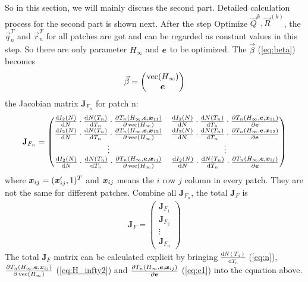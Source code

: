 So in this section, we will mainly discuss the second part. Detailed calculation process for the second part is shown next. After the step Optimize $\vec{Q}^k, \vec{R}^{(k)}$, the $\vec{q}_n^T$ and $\vec{r}_n^T$ for all patches are got and can be regarded as constant values in this step. So there are only parameter $H_\infty$ and $\boldsymbol{e}$ to be optimized. The $\vec{\beta}$ (\cref{eq:beta}) becomes 
\begin{align}
	\vec{\beta} =  \begin{pmatrix}\operatorname {vec}(H_\infty)\\\boldsymbol{e}\end{pmatrix}
\end{align}
the Jacobian matrix $\mathbf{J}_{F_n}$ for patch n: 
\begin{align}
	\mathbf{J}_{F_n} = \begin{pmatrix}
	\frac{\mathrm{d} I_2(N)}{\mathrm{d}N} \cdot \frac{\mathrm{d} N(T_n)}{\mathrm{d} T_n} \cdot \frac{\partial T_n(H_\infty, \boldsymbol{e}, \boldsymbol{x}_{11})}{\partial \operatorname {vec}(H_\infty)} & \frac{\mathrm{d} I_2(N)}{\mathrm{d}N} \cdot \frac{\mathrm{d} N(T_n)}{\mathrm{d} T_n} \cdot \frac{\partial T_n(H_\infty, \boldsymbol{e}, \boldsymbol{x}_{11})}{\partial \boldsymbol{e}} \\
	\frac{\mathrm{d} I_2(N)}{\mathrm{d}N} \cdot \frac{\mathrm{d} N(T_n)}{\mathrm{d} T_n} \cdot \frac{\partial T_n(H_\infty, \boldsymbol{e}, \boldsymbol{x}_{12})}{\partial \operatorname {vec}(H_\infty)} & \frac{\mathrm{d} I_2(N)}{\mathrm{d}N} \cdot \frac{\mathrm{d} N(T_n)}{\mathrm{d} T_n} \cdot \frac{\partial T_n(H_\infty, \boldsymbol{e}, \boldsymbol{x}_{12})}{\partial \boldsymbol{e}} \\
	\vdots & \vdots \\
	\frac{\mathrm{d} I_2(N)}{\mathrm{d}N} \cdot \frac{\mathrm{d} N(T_n)}{\mathrm{d} T_n} \cdot \frac{\partial T_n(H_\infty, \boldsymbol{e}, \boldsymbol{x}_{ij})}{\partial \operatorname {vec}(H_\infty)} & \frac{\mathrm{d} I_2(N)}{\mathrm{d}N} \cdot \frac{\mathrm{d} N(T_n)}{\mathrm{d} T_n} \cdot \frac{\partial T_n(H_\infty, \boldsymbol{e}, \boldsymbol{x}_{ij})}{\partial \boldsymbol{e}} \\
	\end{pmatrix}
\end{align}
where $\boldsymbol{x}_{ij} = (\boldsymbol{x}'_{ij}, 1)^T$ and $\boldsymbol{x}_{ij}$ means the $i$ row $j$ column in every patch. They are not the same for different patches. Combine all $\mathbf{J}_{F_n}$, the total $\mathbf{J}_{F}$ is
\begin{align}\label{eq:J_F}
	\mathbf{J}_{F} = \begin{pmatrix} \mathbf{J}_{F_1}\\
	\mathbf{J}_{F_2}\\
	\vdots\\
	\mathbf{J}_{F_n} 
	\end{pmatrix}
\end{align}
The total $\mathbf{J}_{F}$ matrix can be calculated explicit by bringing $\frac{\mathrm{d} N(T_n)}{\mathrm{d} T_n}$ (\cref{eq:n}), $\frac{\partial T_n(H_\infty, \boldsymbol{e}, \boldsymbol{x}_{ij})}{\partial \operatorname {vec}(H_\infty)}$ (\cref{eq:H_infty2}) and $ \frac{\partial T_n(H_\infty, \boldsymbol{e}, \boldsymbol{x}_{ij})}{\partial \boldsymbol{e}}$ (\cref{eq:e1}) into the equation above.

